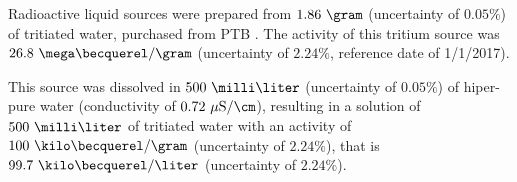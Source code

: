 Radioactive liquid sources were prepared from $1.86~\gram$ (uncertainty of $0.05\%$) of tritiated water, purchased from PTB \cite{PTB}. The activity of this tritium source was $26.8~\mega\becquerel/\gram$ (uncertainty of $2.24\%$, reference date of 1/1/2017).

This source was dissolved in $500~\milli\liter$ (uncertainty of $0.05\%$) of hiper-pure water (conductivity of $0.72~\mu\text{S}/\cm$), resulting in a solution of $500~\milli\liter$ of tritiated water with an activity of $100~\kilo\becquerel/\gram$ (uncertainty of $2.24\%$), that is $99.7~\kilo\becquerel/\liter$ (uncertainty of $2.24\%$).



